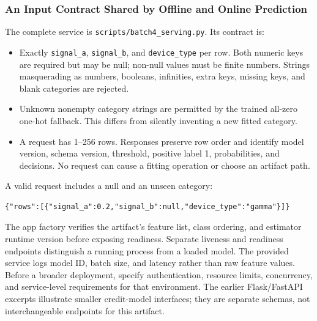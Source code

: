 \documentclass[11pt,twoside]{article}
\numberwithin{equation}{section}
\theoremstyle{plain}
\theoremstyle{definition}
\theoremstyle{remark}
\begin{document}
\subsubsection{An Input Contract Shared by Offline and Online Prediction}
\label{sec:device-contract}
The complete service is \texttt{scripts/batch4\_serving.py}. Its contract is:
\begin{itemize}
\item Exactly \texttt{signal\_a}, \texttt{signal\_b}, and \texttt{device\_type}
per row. Both numeric keys are required but may be null; non-null values must
be finite numbers. Strings masquerading as numbers, booleans, infinities,
extra keys, missing keys, and blank categories are rejected.
\item Unknown nonempty category strings are permitted by the trained all-zero
one-hot fallback. This differs from silently inventing a new fitted category.
\item A request has 1--256 rows. Responses preserve row order and identify model
version, schema version, threshold, positive label 1, probabilities, and decisions.
No request can cause a fitting operation or choose an artifact path.
\end{itemize}
A valid request includes a null and an unseen category:
\begin{lstlisting}
{"rows":[{"signal_a":0.2,"signal_b":null,"device_type":"gamma"}]}
\end{lstlisting}
The app factory verifies the artifact's feature list, class ordering, and
estimator runtime version before exposing readiness. Separate liveness and
readiness endpoints distinguish a running process from a loaded model.
The provided service logs model ID, batch size, and latency rather than raw
feature values. Before a broader deployment, specify authentication, resource
limits, concurrency, and service-level requirements for that environment.
The earlier Flask/FastAPI excerpts illustrate smaller credit-model interfaces;
they are separate schemas, not interchangeable endpoints for this artifact.
\end{document}
